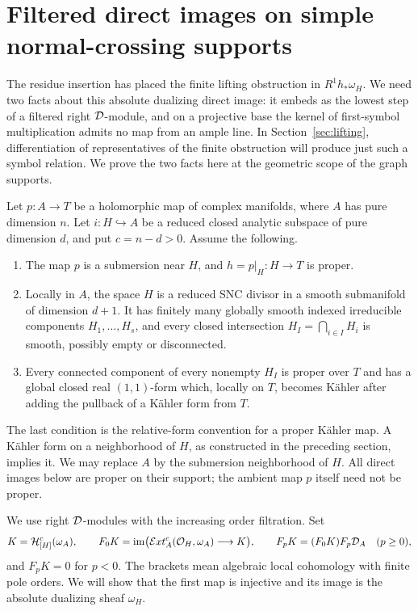 \section{Filtered direct images on simple normal-crossing supports}\label{sec:hodge}

The residue insertion has placed the finite lifting obstruction in
\(R^1h_*\omega_H\).  We need two facts about this absolute dualizing
direct image: it embeds as the lowest step of a filtered right
\(\mathcal D\)-module, and on a projective base the kernel of first-symbol
multiplication admits no map from an ample line.  In
Section~\ref{sec:lifting}, differentiation of representatives of the
finite obstruction will produce just such a symbol relation.  We prove
the two facts here at the geometric scope of the graph supports.

Let \(p:A\to T\) be a holomorphic map of complex manifolds, where \(A\)
has pure dimension \(n\).  Let \(i:H\hookrightarrow A\) be a reduced
closed analytic subspace of pure dimension \(d\), and put \(c=n-d>0\).
Assume the following.
\begin{enumerate}
 \item The map \(p\) is a submersion near \(H\), and \(h=p|_H:H\to T\)
 is proper.
 \item Locally in \(A\), the space \(H\) is a reduced SNC divisor in a
 smooth submanifold of dimension \(d+1\).  It has finitely many globally
 smooth indexed irreducible components \(H_1,\ldots,H_s\), and every
 closed intersection \(H_I=\bigcap_{i\in I}H_i\) is smooth, possibly
 empty or disconnected.
 \item Every connected component of every nonempty \(H_I\) is proper
 over \(T\) and has a global closed real \((1,1)\)-form which, locally
 on \(T\), becomes K\"ahler after adding the pullback of a K\"ahler form
 from \(T\).
\end{enumerate}
The last condition is the relative-form convention for a proper K\"ahler
map.  A K\"ahler form on a neighborhood of \(H\), as constructed in the
preceding section, implies it.  We may replace \(A\) by the submersion
neighborhood of \(H\).  All direct images below are proper on their
support; the ambient map \(p\) itself need not be proper.

We use right \(\mathcal D\)-modules with the increasing order filtration.
Set
\begin{equation}\label{eq:support-module}
 K=\mathcal H^c_{[H]}(\omega_A),\qquad
 F_0K=\operatorname{im}\bigl(\mathcal{E}xt^c_A(\mathcal O_H,\omega_A)\longrightarrow K\bigr),
 \qquad F_pK=(F_0K)F_p\mathcal D_A\quad(p\geq0),
\end{equation}
and \(F_pK=0\) for \(p<0\).  The brackets mean algebraic local
cohomology with finite pole orders.  We will show that the first map is
injective and its image is the absolute dualizing sheaf \(\omega_H\).

